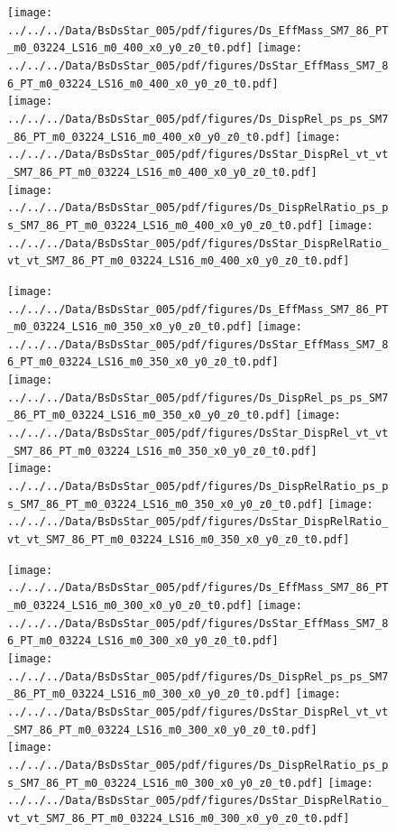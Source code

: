 \documentclass[a4paper,10pt]{article}
\begin{document}
\begin{figure}[p]
 \texttt{[image: ../../../Data/BsDsStar\_005/pdf/figures/Ds\_EffMass\_SM7\_86\_PT\_m0\_03224\_LS16\_m0\_400\_x0\_y0\_z0\_t0.pdf]}  
\texttt{[image: ../../../Data/BsDsStar\_005/pdf/figures/DsStar\_EffMass\_SM7\_86\_PT\_m0\_03224\_LS16\_m0\_400\_x0\_y0\_z0\_t0.pdf]} \\ 
\texttt{[image: ../../../Data/BsDsStar\_005/pdf/figures/Ds\_DispRel\_ps\_ps\_SM7\_86\_PT\_m0\_03224\_LS16\_m0\_400\_x0\_y0\_z0\_t0.pdf]}  
\texttt{[image: ../../../Data/BsDsStar\_005/pdf/figures/DsStar\_DispRel\_vt\_vt\_SM7\_86\_PT\_m0\_03224\_LS16\_m0\_400\_x0\_y0\_z0\_t0.pdf]} \\ 
\texttt{[image: ../../../Data/BsDsStar\_005/pdf/figures/Ds\_DispRelRatio\_ps\_ps\_SM7\_86\_PT\_m0\_03224\_LS16\_m0\_400\_x0\_y0\_z0\_t0.pdf]}  
\texttt{[image: ../../../Data/BsDsStar\_005/pdf/figures/DsStar\_DispRelRatio\_vt\_vt\_SM7\_86\_PT\_m0\_03224\_LS16\_m0\_400\_x0\_y0\_z0\_t0.pdf]} \\ 
\end{figure} 
\clearpage

\begin{figure}[p]
 \texttt{[image: ../../../Data/BsDsStar\_005/pdf/figures/Ds\_EffMass\_SM7\_86\_PT\_m0\_03224\_LS16\_m0\_350\_x0\_y0\_z0\_t0.pdf]}  
\texttt{[image: ../../../Data/BsDsStar\_005/pdf/figures/DsStar\_EffMass\_SM7\_86\_PT\_m0\_03224\_LS16\_m0\_350\_x0\_y0\_z0\_t0.pdf]} \\ 
\texttt{[image: ../../../Data/BsDsStar\_005/pdf/figures/Ds\_DispRel\_ps\_ps\_SM7\_86\_PT\_m0\_03224\_LS16\_m0\_350\_x0\_y0\_z0\_t0.pdf]}  
\texttt{[image: ../../../Data/BsDsStar\_005/pdf/figures/DsStar\_DispRel\_vt\_vt\_SM7\_86\_PT\_m0\_03224\_LS16\_m0\_350\_x0\_y0\_z0\_t0.pdf]} \\ 
\texttt{[image: ../../../Data/BsDsStar\_005/pdf/figures/Ds\_DispRelRatio\_ps\_ps\_SM7\_86\_PT\_m0\_03224\_LS16\_m0\_350\_x0\_y0\_z0\_t0.pdf]}  
\texttt{[image: ../../../Data/BsDsStar\_005/pdf/figures/DsStar\_DispRelRatio\_vt\_vt\_SM7\_86\_PT\_m0\_03224\_LS16\_m0\_350\_x0\_y0\_z0\_t0.pdf]} \\ 
\end{figure} 
\clearpage

\begin{figure}[p]
 \texttt{[image: ../../../Data/BsDsStar\_005/pdf/figures/Ds\_EffMass\_SM7\_86\_PT\_m0\_03224\_LS16\_m0\_300\_x0\_y0\_z0\_t0.pdf]}  
\texttt{[image: ../../../Data/BsDsStar\_005/pdf/figures/DsStar\_EffMass\_SM7\_86\_PT\_m0\_03224\_LS16\_m0\_300\_x0\_y0\_z0\_t0.pdf]} \\ 
\texttt{[image: ../../../Data/BsDsStar\_005/pdf/figures/Ds\_DispRel\_ps\_ps\_SM7\_86\_PT\_m0\_03224\_LS16\_m0\_300\_x0\_y0\_z0\_t0.pdf]}  
\texttt{[image: ../../../Data/BsDsStar\_005/pdf/figures/DsStar\_DispRel\_vt\_vt\_SM7\_86\_PT\_m0\_03224\_LS16\_m0\_300\_x0\_y0\_z0\_t0.pdf]} \\ 
\texttt{[image: ../../../Data/BsDsStar\_005/pdf/figures/Ds\_DispRelRatio\_ps\_ps\_SM7\_86\_PT\_m0\_03224\_LS16\_m0\_300\_x0\_y0\_z0\_t0.pdf]}  
\texttt{[image: ../../../Data/BsDsStar\_005/pdf/figures/DsStar\_DispRelRatio\_vt\_vt\_SM7\_86\_PT\_m0\_03224\_LS16\_m0\_300\_x0\_y0\_z0\_t0.pdf]} \\ 
\end{figure} 
\clearpage
\end{document}
